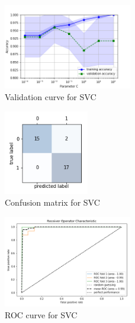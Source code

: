 \documentclass[acmtog, authorversion]{acmart}
\begin{document}
\begin{figure}[h]
  \includegraphics[width=0.5\textwidth]{validation_curve}
  \caption{Validation curve for SVC}
  \label{fig:validation_curve}
\end{figure}

\begin{figure}[h]
  \includegraphics[width=0.33\textwidth]{confusion_matrix}
  \caption{Confusion matrix for SVC}
  \label{fig:confusion_matrix}
\end{figure}

\begin{figure}[h]
  \includegraphics[width=0.5\textwidth]{ROC_curve}
  \caption{ROC curve for SVC}
  \label{fig:ROC_curve}
\end{figure}
\end{document}
